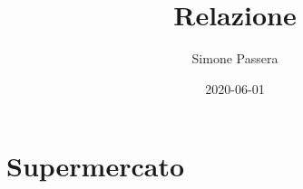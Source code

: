 \documentclass{article}
\title{Relazione}
\date{2020-06-01}
\author{Simone Passera}
\begin{document}
  \maketitle
  \newpage
  
  \section{Supermercato}
\end{document}
